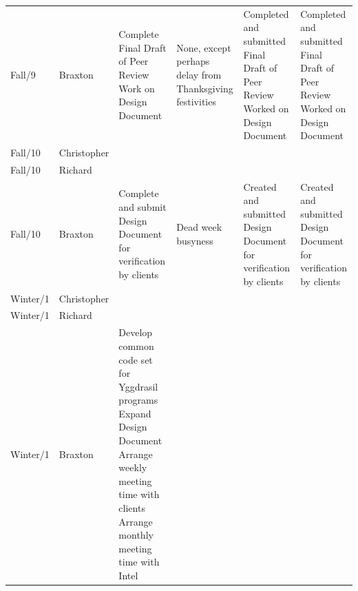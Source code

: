 \documentclass[onecolumn, draftclsnofoot,10pt, compsoc]{IEEEtran}
\begin{document}
\begin{tiny}
\begin{longtable}{ | p{} | p{} | p{} | p{} | p{} | p{} | }
&

&

\\ \hline
Fall/9 & Braxton & 

Complete Final Draft of Peer Review \newline
Work on Design Document 

&

None, except perhaps delay from Thanksgiving festivities 

&

Completed and submitted Final Draft of Peer Review \newline
Worked on Design Document 

&

Completed and submitted Final Draft of Peer Review 
Worked on Design Document 

\\ \hline
Fall/10 & Christopher & 

&

&

&

\\ \hline
Fall/10 & Richard & 

&

&

&

\\ \hline
Fall/10 & Braxton & 

Complete and submit Design Document for verification by clients 

&

Dead week busyness 

&

Created and submitted Design Document for verification by clients 

&

Created and submitted Design Document for verification by clients 

\\ \hline
Winter/1 & Christopher & 

&

&

&

\\ \hline
Winter/1 & Richard & 

&

&

&

\\ \hline
Winter/1 & Braxton & 

Develop common code set for Yggdrasil programs \newline
Expand Design Document \newline
Arrange weekly meeting time with clients \newline
Arrange monthly meeting time with Intel 


\end{longtable}
\end{tiny}
\end{document}
